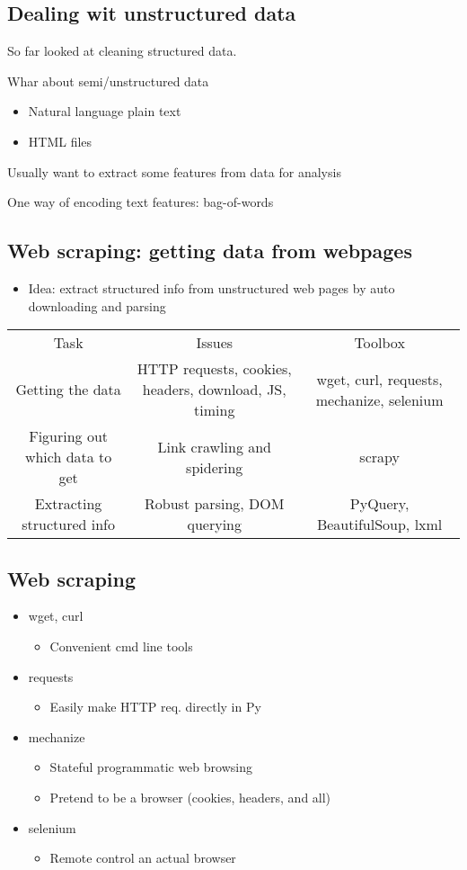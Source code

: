 \documentclass[a4paper]{article}
\begin{document}
\subsection{Dealing wit unstructured data}
So far looked at cleaning structured data.
\par Whar about semi/unstructured data
\begin{itemize}
	\item Natural language plain text
	\item HTML files
\end{itemize}
Usually want to extract some features from data for analysis
\par One way of encoding text features: bag-of-words
\subsection{Web scraping: getting data from webpages}
\begin{itemize}
	\item Idea: extract structured info from unstructured web pages by auto
		downloading and parsing
\end{itemize}
\begin{table}[htpb]
	\centering
	\begin{tabular}{|c | c | c|}
		Task & Issues & Toolbox \\
		Getting the data & HTTP requests, cookies, headers, download,
		JS, timing & wget, curl, requests, mechanize,
	selenium} \\
		Figuring out which data to get & Link crawling and spidering &
		scrapy \\
		Extracting structured info & Robust parsing, DOM querying &
		PyQuery, BeautifulSoup, lxml &
	\end{tabular}
\end{table}
\subsection{Web scraping}
\begin{itemize}
	\item wget, curl
	\begin{itemize}
		\item Convenient cmd line tools
	\end{itemize}
	\item requests
	\begin{itemize}
		\item Easily make HTTP req. directly in Py
	\end{itemize}
	\item mechanize
	\begin{itemize}
		\item Stateful programmatic web browsing
		\item Pretend to be a browser (cookies, headers, and all)
	\end{itemize}
	\item selenium
	\begin{itemize}
		\item Remote control an actual browser
	\end{itemize}
\end{itemize}
\end{document}
